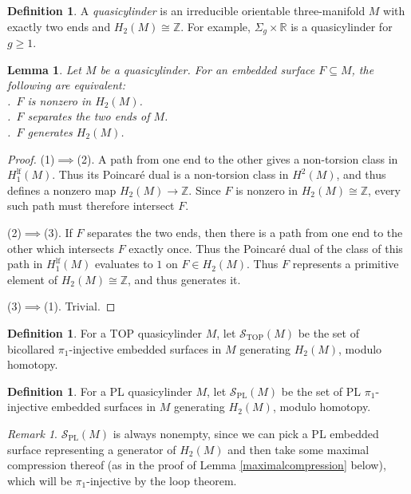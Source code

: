 \documentclass[12pt]{article}
\theoremstyle{plain}
\newtheorem{lemma}[theorem]{Lemma}
\theoremstyle{definition}
\newtheorem{definition}[theorem]{Definition}
\theoremstyle{remark}
\newtheorem{remark}[theorem]{Remark}
\numberwithin{equation}{section}
\begin{document}
\begin{definition}\label{approxsurf}
A \emph{quasicylinder} is an irreducible orientable three-manifold $M$ with exactly two ends and $H_2(M)\cong\mathbb Z$.  For example, $\Sigma_g\times\mathbb R$ is a quasicylinder for $g\geq 1$.
\end{definition}

\begin{lemma}
Let $M$ be a quasicylinder.  For an embedded surface $F\subseteq M$, the following are equivalent:\\
.\ $F$ is nonzero in $H_2(M)$.\\
.\ $F$ separates the two ends of $M$.\\
.\ $F$ generates $H_2(M)$.
\end{lemma}

\begin{proof}
(1)$\implies$(2).  A path from one end to the other gives a non-torsion class in $H_1^{\operatorname{lf}}(M)$.  Thus its Poincar\'e dual is a non-torsion class in $H^2(M)$, and thus defines a nonzero map $H_2(M)\to\mathbb Z$.  Since $F$ is nonzero in $H_2(M)\cong\mathbb Z$, every such path must therefore intersect $F$.

(2)$\implies$(3).  If $F$ separates the two ends, then there is a path from one end to the other which intersects $F$ exactly once.  Thus the Poincar\'e dual of the class of this path in $H_1^{\operatorname{lf}}(M)$ evaluates to $1$ on $F\in H_2(M)$.  Thus $F$ represents a primitive element of $H_2(M)\cong\mathbb Z$, and thus generates it.

(3)$\implies$(1).  Trivial.
\end{proof}

\begin{definition}
For a TOP quasicylinder $M$, let $\mathcal S_{\operatorname{TOP}}(M)$ be the set of bicollared $\pi_1$-injective embedded surfaces in $M$ generating $H_2(M)$, modulo homotopy.
\end{definition}

\begin{definition}
For a PL quasicylinder $M$, let $\mathcal S_{\operatorname{PL}}(M)$ be the set of PL $\pi_1$-injective embedded surfaces in $M$ generating $H_2(M)$, modulo homotopy.
\end{definition}

\begin{remark}\label{nonempty}
$\mathcal S_{\operatorname{PL}}(M)$ is always nonempty, since we can pick a PL embedded surface representing a generator of $H_2(M)$ and then take some maximal compression thereof (as in the proof of Lemma \ref{maximalcompression} below), which will be $\pi_1$-injective by the loop theorem.
\end{remark}
\end{document}

